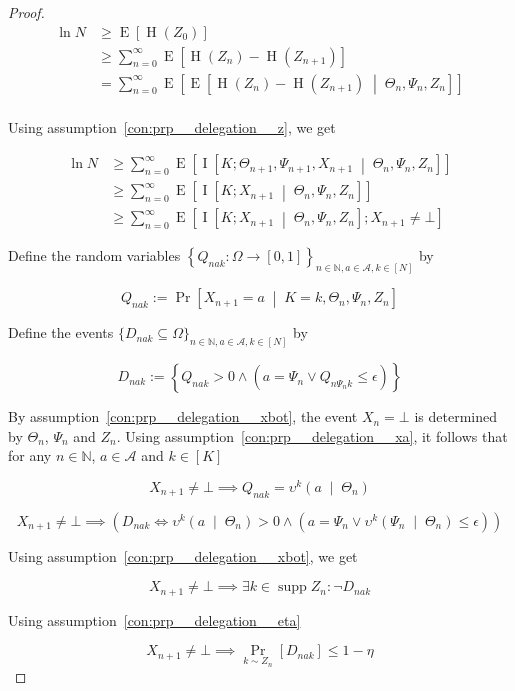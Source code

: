 \documentclass[anon,12pt]{colt2018} %
\DeclareMathOperator{\Supp}{supp}
\newcommand{\AP}[1]{\left(#1\right)}
\newcommand{\AB}[1]{\left[#1\right]}
\newcommand{\AC}[1]{\left\{#1\right\}}
\newcommand{\APM}[2]{\left(#1\;\middle\vert\;#2\right)}
\newcommand{\ABM}[2]{\left[#1\;\middle\vert\;#2\right]}
\newcommand{\Pa}[2]{\underset{#1}{\operatorname{Pr}}\AB{#2}}
\newcommand{\CP}[3]{\underset{#1}{\operatorname{Pr}}\ABM{#2}{#3}}
\newcommand{\Ea}[2]{\underset{#1}{\operatorname{E}}\AB{#2}}
\newcommand{\CE}[3]{\underset{#1}{\operatorname{E}}\ABM{#2}{#3}}
\newcommand{\CI}[3]{\underset{#1}{\operatorname{I}}\ABM{#2}{#3}}
\newcommand{\Ena}[1]{\operatorname{H}\AP{#1}}
\newcommand{\Nats}{\mathbb{N}}
\newcommand{\A}{\mathcal{A}}
\newcommand{\Ad}{\upsilon}
\begin{document}
\begin{proof}

\begin{align*}
\ln{N} &\geq \Ea{}{\Ena{Z_0}} \\ 
&\geq \sum_{n=0}^\infty{\Ea{}{\Ena{Z_n}-\Ena{Z_{n+1}}}}\\
&= \sum_{n=0}^\infty{\Ea{}{\CE{}{\Ena{Z_n}-\Ena{Z_{n+1}}}{\Theta_n,\Psi_n,Z_n}}}\\
\end{align*}

Using assumption~\ref{con:prp__delegation__z}, we get

\begin{align}
\ln{N} &\geq \sum_{n=0}^\infty\Ea{}{\CI{}{K;\Theta_{n+1},\Psi_{n+1},X_{n+1}}{\Theta_n,\Psi_n,Z_n}}\nonumber\\ 
&\geq\sum_{n=0}^\infty\Ea{}{\CI{}{K;X_{n+1}}{\Theta_n,\Psi_n,Z_n}}\nonumber\\
\label{eqn:prp__delegation__proof__entropy}&\geq\sum_{n=0}^\infty\Ea{}{\CI{}{K;X_{n+1}}{\Theta_n,\Psi_n,Z_n};X_{n+1}\ne\bot}
\end{align}

Define the random variables $\AC{Q_{nak}: \Omega \rightarrow [0,1]}_{n \in \Nats, a \in \A, k\in[N]}$ by

\[Q_{nak}:=\CP{}{X_{n+1}=a}{K=k,\Theta_n,\Psi_n,Z_n}\]

Define the events $\{D_{nak} \subseteq \Omega\}_{n \in \Nats, a \in \A, k\in[N]}$ by

\[D_{nak}:=\AC{Q_{nak} > 0 \land \AP{a = \Psi_n \lor Q_{n\Psi_n k} \leq \epsilon}}\]

By assumption~\ref{con:prp__delegation__xbot}, the event $X_n=\bot$ is determined by $\Theta_n$, $\Psi_n$ and $Z_n$. Using assumption~\ref{con:prp__delegation__xa}, it follows that for any $n \in \Nats$, $a \in \A$ and $k \in [K]$

\[X_{n+1} \ne \bot \implies Q_{nak} = \Ad^k\APM{a}{\Theta_n}\]

\[X_{n+1} \ne \bot \implies \AP{D_{nak} \iff \Ad^k\APM{a}{\Theta_n} > 0 \land \AP{a = \Psi_n \lor \Ad^k\APM{\Psi_n}{\Theta_n} \leq \epsilon}}\]

Using assumption~\ref{con:prp__delegation__xbot}, we get

\[X_{n+1} \ne \bot \implies \exists k \in \Supp{Z_n}: \neg D_{nak}\]

Using assumption~\ref{con:prp__delegation__eta}

\[X_{n+1} \ne \bot \implies \Pa{k\sim Z_n}{D_{nak}} \leq 1 - \eta\]


\end{proof}
\end{document}
